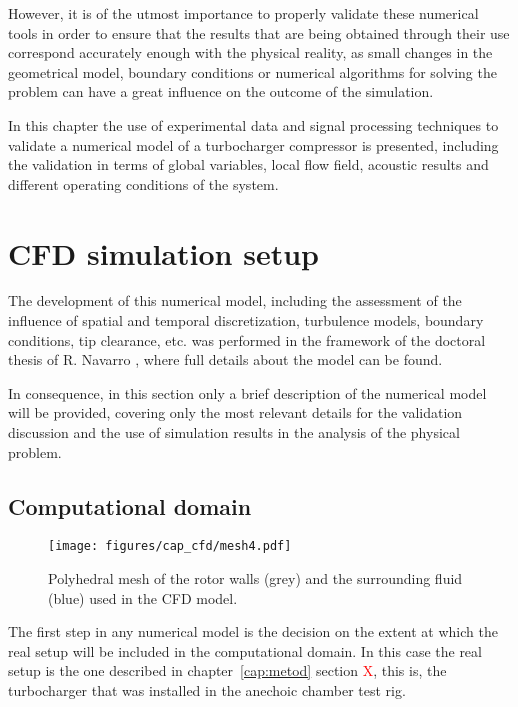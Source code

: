 However, it is of the utmost importance to properly validate these numerical tools in order to ensure that the results that are being obtained through their use correspond accurately enough with the physical reality, as small changes in the geometrical model, boundary conditions or numerical algorithms for solving the problem can have a great influence on the outcome of the simulation.

In this chapter the use of experimental data and signal processing techniques to validate a numerical model of a turbocharger compressor is presented, including the validation in terms of global variables, local flow field, acoustic results and different operating conditions of the system. 

\section{CFD simulation setup} %

The development of this numerical model, including the assessment of the influence of spatial and temporal discretization, turbulence models, boundary conditions, tip clearance, etc. was performed in the framework of the doctoral thesis of R. Navarro \cite{navarro2014numerical}, where full details about the model can be found.

In consequence, in this section only a brief description of the numerical model will be provided, covering only the most relevant details for the validation discussion and the use of simulation results in the analysis of the physical problem.

\subsection{Computational domain}

\begin{wrapfigure}[16]{I}[0cm]{0.4\textwidth}
\raggedleft
\vspace{-4mm}
\texttt{[image: figures/cap\_cfd/mesh4.pdf]}
\caption{Polyhedral mesh of the rotor walls (grey) and the surrounding fluid (blue) used in the CFD model.}
\label{fig:cfd_mesh}
\end{wrapfigure}

The first step in any numerical model is the decision on the extent at which the real setup will be included in the computational domain. In this case the real setup is the one described in chapter~\ref{cap:metod} section \textcolor{red}{X}, this is, the turbocharger that was installed in the anechoic chamber test rig. 

